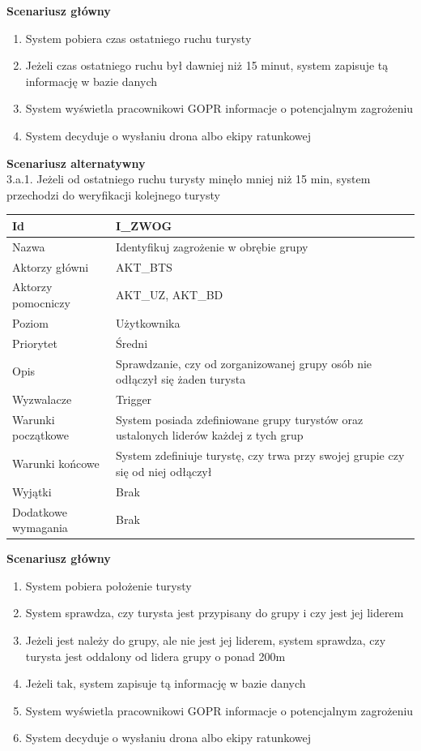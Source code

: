 \documentclass[a4paper,12pt]{article}
\begin{document}
\textbf{Scenariusz główny}
\begin{enumerate}
\item System pobiera czas ostatniego ruchu turysty
\item Jeżeli czas ostatniego ruchu był dawniej niż 15 minut, system zapisuje tą informację w bazie danych
\item System wyświetla pracownikowi GOPR informacje o potencjalnym zagrożeniu
\item System decyduje o wysłaniu drona albo ekipy ratunkowej
\end{enumerate}
\textbf{Scenariusz alternatywny}\\
3.a.1. Jeżeli od ostatniego ruchu turysty minęło mniej niż 15 min, system przechodzi do weryfikacji kolejnego turysty
\newpage
\begin{longtable}{| p{5cm} | p{10cm} |}
\hline
Id & I\_ZWOG \\\hline
Nazwa & Identyfikuj zagrożenie w obrębie grupy \\\hline
Aktorzy główni & AKT\_BTS \\\hline
Aktorzy pomocniczy & AKT\_UZ, AKT\_BD \\\hline
Poziom & Użytkownika \\\hline
Priorytet & Średni \\\hline
Opis & Sprawdzanie, czy od zorganizowanej grupy osób nie odłączył się żaden turysta \\\hline
Wyzwalacze & Trigger \\\hline
Warunki początkowe & System posiada zdefiniowane grupy turystów oraz ustalonych liderów każdej z tych grup \\\hline
Warunki końcowe & System zdefiniuje turystę, czy trwa przy swojej grupie czy się od niej odłączył \\\hline
Wyjątki & Brak \\\hline
Dodatkowe wymagania & Brak \\\hline
\end{longtable}
\textbf{Scenariusz główny}
\begin{enumerate}
\item System pobiera położenie turysty
\item System sprawdza, czy turysta jest przypisany do grupy i czy jest jej liderem
\item Jeżeli jest należy do grupy, ale nie jest jej liderem, system sprawdza, czy turysta jest oddalony od lidera grupy o ponad 200m
\item Jeżeli tak, system zapisuje tą informację w bazie danych
\item System wyświetla pracownikowi GOPR informacje o potencjalnym zagrożeniu
\item System decyduje o wysłaniu drona albo ekipy ratunkowej
\end{enumerate}
\end{document}
